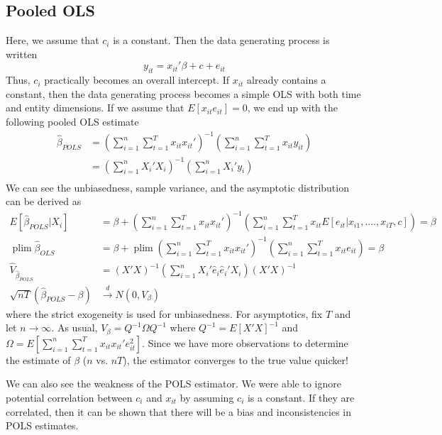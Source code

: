 \documentclass[12pt]{article}
\theoremstyle{definition}
\theoremstyle{property}
\theoremstyle{assumption}
\theoremstyle{example}
\theoremstyle{comment}
\DeclareMathOperator*{\plim}{plim}
\begin{document}
\subsection{Pooled OLS}
Here, we assume that $c_i$ is a constant. Then the data generating process is written
\[
y_{it} = x_{it}'\beta + c + e_{it}
\]
Thus, $c_i$ practically becomes an overall intercept. If $x_{it}$ already contains a constant, then the data generating process becomes a simple OLS with both time and entity dimensions. If we assume that $E[x_{it}e_{it}]=0$, we end up with the following pooled OLS estimate 
\[
\begin{aligned}
\hat{\beta}_{POLS}&=\left(\sum_{i=1}^n\sum_{t=1}^Tx_{it}x_{it}'\right)^{-1}\left(\sum_{i=1}^n\sum_{t=1}^Tx_{it}y_{it}\right)\\
&=\left(\sum_{i=1}^nX_{i}'X_{i}\right)^{-1}\left(\sum_{i=1}^nX_{i}'y_{i}\right)\\
\end{aligned}
\]
We can see the unbiasedness, sample variance, and the asymptotic distribution can be derived as
\[
\begin{aligned}
E[\hat{\beta}_{POLS}|X_i]&= \beta + \left(\sum_{i=1}^n\sum_{t=1}^Tx_{it}x_{it}'\right)^{-1}\left(\sum_{i=1}^n\sum_{t=1}^Tx_{it}E[e_{it}|x_{i1},....,x_{iT},c]\right)=\beta\\
\plim\hat{\beta}_{OLS}&=\beta+\plim\left(\sum_{i=1}^n\sum_{t=1}^Tx_{it}x_{it}'\right)^{-1}\left(\sum_{i=1}^n\sum_{t=1}^Tx_{it}e_{it}\right) = \beta\\
\widehat{V}_{\hat{\beta}_{POLS}}&= (X'X)^{-1}\left(\sum_{i=1}^n X_i'\hat{e}_i\hat{e}_i'X_i\right)(X'X)^{-1}\\
\sqrt{nT}(\hat{\beta}_{POLS}-\beta)&\xrightarrow{d}N(0,V_\beta)
\end{aligned}
\]
where the strict exogeneity is used for unbiasedness. For asymptotics, fix $T$ and let $n\to\infty$. As usual, $V_\beta=Q^{-1}\Omega Q^{-1}$ where $Q^{-1}=E[X'X]^{-1}$ and $\Omega = E\left[\sum_{i=1}^n\sum_{t=1}^Tx_{it}x_{it}'e_{it}^2\right]$. Since we have more observations to determine the estimate of $\beta$ ($n$ vs. $nT$), the estimator converges to the true value quicker! 
\par
We can also see the weakness of the POLS estimator. We were able to ignore potential correlation between $c_i$ and $x_{it}$ by assuming $c_i$ is a constant. If they are correlated, then it can be shown that there will be a bias and inconsistencies in POLS estimates. 
\end{document}
